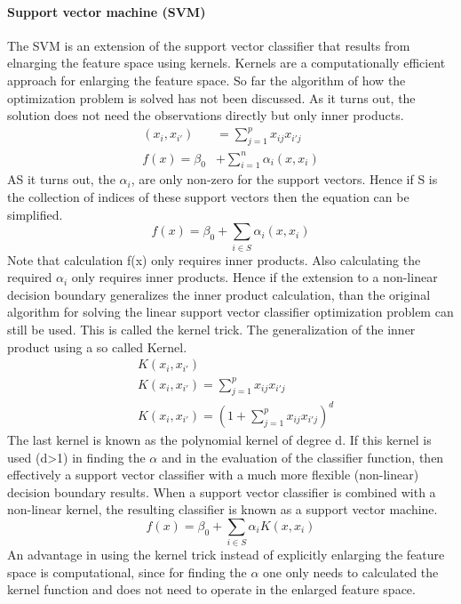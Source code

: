 \documentclass[../document.tex]{subfiles}
\begin{document}
	\paragraph{Support vector machine (SVM)}
	The SVM is an extension of the support vector classifier that results from elnarging the feature space using kernels. Kernels are a computationally efficient approach for enlarging the feature space. So far the algorithm of how the optimization problem is solved has not been discussed. As it turns out, the solution does not need the observations directly but only inner products.
	\begin{equation}
	\begin{split}
		(x_{i},x_{i'})&=\sum_{j=1}^{p}x_{ij}x_{i'j}\\
		f(x)=\beta_{0}&+\sum_{i=1}^{n}\alpha_{i}(x,x_{i})
	\end{split}
	\end{equation}
	AS it turns out, the \(\alpha_{i}\), are only non-zero for the support vectors. Hence if S is the collection of indices of these support vectors then the equation can be simplified.
	\begin{equation}
		f(x)=\beta_{0}+\sum_{i\in S}\alpha_{i}(x,x_{i})
	\end{equation}
	Note that calculation f(x) only requires inner products. Also calculating the required \(\alpha_{i}\) only requires inner products. Hence if the extension to a non-linear decision boundary generalizes the inner product calculation, than the original algorithm for solving the linear support vector classifier optimization problem can still be used. This is called the kernel trick. The generalization of the inner product using a so called Kernel.
	\begin{equation}
	\begin{split}
		&K(x_{i},x_{i'})\\
		&K(x_{i},x_{i'})=\sum_{j=1}^{p}x_{ij}x_{i'j}\\
		&K(x_{i},x_{i'})=(1+\sum_{j=1}^{p}x_{ij}x_{i'j})^d
	\end{split}
	\end{equation}
	The last kernel is known as the polynomial kernel of degree d. If this kernel is used (d>1) in finding the \(\alpha\) and in the evaluation of the classifier function, then effectively a support vector classifier with a much more flexible (non-linear) decision boundary results. When a support vector classifier is combined with a non-linear kernel, the resulting classifier is known as a support vector machine.
	\begin{equation}
		f(x)=\beta_{0}+\sum_{i\in S}\alpha_{i}K(x,x_{i})
	\end{equation}
	An advantage in using the kernel trick instead of explicitly enlarging the feature space is computational, since for finding the \(\alpha\) one only needs to calculated the kernel function and does not need to operate in the enlarged feature space. 
\end{document}
